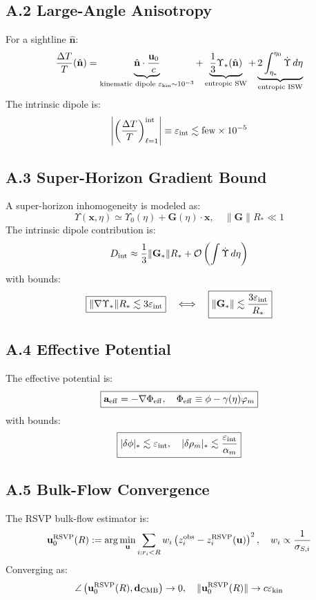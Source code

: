\documentclass{article}
\begin{document}
{\subsection*{A.2 Large-Angle Anisotropy}
For a sightline \(\hat{\mathbf{n}}\):
\[
\frac{\Delta T}{T}(\hat{\mathbf{n}}) = \underbrace{\hat{\mathbf{n}} \cdot \frac{\mathbf{u}_0}{c}}_{\text{kinematic dipole } \varepsilon_{\rm kin} \sim 10^{-3}} + \underbrace{\frac{1}{3}\Upsilon_*(\hat{\mathbf{n}})}_{\text{entropic SW}} + \underbrace{2 \int_{\eta_*}^{\eta_0} \dot{\Upsilon} \, d\eta}_{\text{entropic ISW}}
\]
The intrinsic dipole is:
\[
\left| \left( \frac{\Delta T}{T} \right)_{\ell=1}^{\rm int} \right| \equiv \varepsilon_{\rm int} \lesssim \text{few} \times 10^{-5}
\]

\subsection*{A.3 Super-Horizon Gradient Bound}
A super-horizon inhomogeneity is modeled as:
\[
\Upsilon(\mathbf{x},\eta) \simeq \Upsilon_0(\eta) + \mathbf{G}(\eta) \cdot \mathbf{x}, \quad \|\mathbf{G}\| R_* \ll 1
\]
The intrinsic dipole contribution is:
\[
D_{\rm int} \approx \frac{1}{3} \|\mathbf{G}_*\| R_* + \mathcal{O}\left( \int \dot{\Upsilon} \, d\eta \right)
\]
with bounds:
\[
\boxed{\|\nabla \Upsilon_*\| R_* \lesssim 3 \varepsilon_{\rm int}} \quad \Longleftrightarrow \quad \boxed{\|\mathbf{G}_*\| \lesssim \frac{3 \varepsilon_{\rm int}}{R_*}}
\]

\subsection*{A.4 Effective Potential}
The effective potential is:
\[
\boxed{\mathbf{a}_{\rm eff} = -\nabla \Phi_{\rm eff}, \quad \Phi_{\rm eff} \equiv \phi - \gamma(\eta) \varphi_m}
\]
with bounds:
\[
\boxed{|\delta\phi|_* \lesssim \varepsilon_{\rm int}, \quad |\delta\rho_m|_* \lesssim \frac{\varepsilon_{\rm int}}{\alpha_m}}
\]

\subsection*{A.5 Bulk-Flow Convergence}
The RSVP bulk-flow estimator is:
\[
\mathbf{u}_0^{\rm RSVP}(R) := \arg\min_{\mathbf{u}} \sum_{i: r_i < R} w_i \left( z_i^{\rm obs} - z_i^{\rm RSVP}(\mathbf{u}) \right)^2, \quad w_i \propto \frac{1}{\sigma_{S,i}}
\]
Converging as:
\[
\angle \left( \mathbf{u}_0^{\rm RSVP}(R), \mathbf{d}_{\rm CMB} \right) \to 0, \quad \|\mathbf{u}_0^{\rm RSVP}(R)\| \to c \varepsilon_{\rm kin}
\]

}
\end{document}
